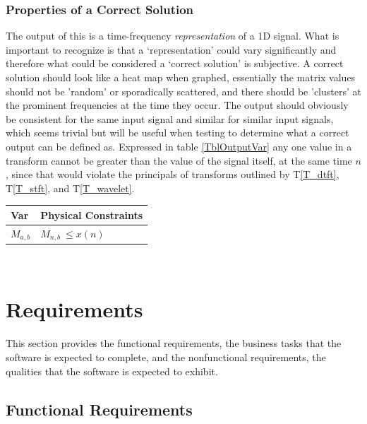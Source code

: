 \documentclass[12pt]{article}
\begin{document}
\subsubsection{Properties of a Correct Solution} \label{sec_CorrectSolution}

\noindent
The output of this \progname{} is a time-frequency \emph{representation} of a 1D signal. What is important to recognize is that a `representation' could vary significantly and therefore what could be considered a `correct solution' is subjective. A correct solution should look like a heat map when graphed, essentially the matrix values should not be 'random' or sporadically scattered, and there should be 'clusters' at the prominent frequencies at the time they occur. The output should obviously be consistent for the same input signal and similar for similar input signals, which seems trivial but will be useful when testing to determine what a correct output can be defined as. Expressed in table \ref{TblOutputVar} any one value in a transform cannot be greater than the value of the signal itself, at the same time $n$, since that would violate the principals of transforms outlined by T\ref{T_dtft}, T\ref{T_stft}, and T\ref{T_wavelet}.

\begin{table}[!h]
\caption{Output Variables} \label{TblOutputVar}
\renewcommand{\arraystretch}{1.2}
\noindent \begin{longtable*}{l l} 
  \toprule
  \textbf{Var} & \textbf{Physical Constraints} \\
  \midrule 
  $M_{a,b}$ & $ M_{n,b}\ \leq x(n) $
  \\
  \bottomrule
\end{longtable*}
\end{table}

~\newpage
\section{Requirements}

This section provides the functional requirements, the business tasks that the
software is expected to complete, and the nonfunctional requirements, the
qualities that the software is expected to exhibit.

\subsection{Functional Requirements}
\end{document}
